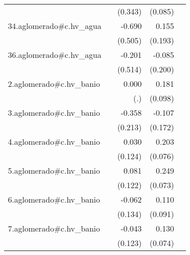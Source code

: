 {\begin{longtable}{l*{4}{D{.}{.}{-1}}}
            &                     &     (0.343)         &     (0.085)         &                     \\
\addlinespace
34.aglomerado#c.hv\_agua&                     &      -0.690         &       0.155         &                     \\
            &                     &     (0.505)         &     (0.193)         &                     \\
\addlinespace
36.aglomerado#c.hv\_agua&                     &      -0.201         &      -0.085         &                     \\
            &                     &     (0.514)         &     (0.200)         &                     \\
\addlinespace
2.aglomerado#c.hv\_banio&                     &       0.000         &       0.181         &                     \\
            &                     &         (.)         &     (0.098)         &                     \\
\addlinespace
3.aglomerado#c.hv\_banio&                     &      -0.358         &      -0.107         &                     \\
            &                     &     (0.213)         &     (0.172)         &                     \\
\addlinespace
4.aglomerado#c.hv\_banio&                     &       0.030         &       0.203\sym{**} &                     \\
            &                     &     (0.124)         &     (0.076)         &                     \\
\addlinespace
5.aglomerado#c.hv\_banio&                     &       0.081         &       0.249\sym{***}&                     \\
            &                     &     (0.122)         &     (0.073)         &                     \\
\addlinespace
6.aglomerado#c.hv\_banio&                     &      -0.062         &       0.110         &                     \\
            &                     &     (0.134)         &     (0.091)         &                     \\
\addlinespace
7.aglomerado#c.hv\_banio&                     &      -0.043         &       0.130         &                     \\
            &                     &     (0.123)         &     (0.074)         &                     \\

\end{longtable}}
